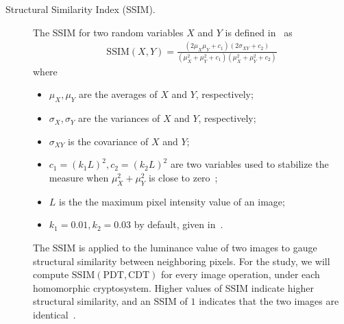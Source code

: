 \begin{description}
	\item [Structural Similarity Index (SSIM).]
	The SSIM for two random variables $X$ and $Y$ is defined in~\cite{ahmed_benchmark_2016, akramullah_video_2014} as
	\begin{align}
        \mathrm{SSIM}(X,Y) = \frac{(2\mu_X\mu_Y+c_1)(2\sigma_{XY}+c_2)}{(\mu_X^2+\mu_Y^2+c_1)(\mu_X^2+\mu_Y^2+c_2)}
	\end{align}
	where
	\begin{itemize}
		\item $\mu_X, \mu_Y$ are the averages of $X$ and $Y$, respectively;
		\item $\sigma_X, \sigma_Y$ are the variances of $X$ and $Y$, respectively;
		\item $\sigma_{XY}$ is the covariance of $X$ and $Y$;
		\item $c_1 = (k_1L)^2, c_2 = (k_2L)^2$ are two variables used to stabilize the measure when $\mu_X^2+\mu_Y^2$ is close to zero~\cite{akramullah_video_2014};
		\item $L$ is the the maximum pixel intensity value of an image;
		\item $k_1 = 0.01, k_2 = 0.03$ by default, given in~\cite{ahmed_benchmark_2016}.
	\end{itemize}
	The SSIM is applied to the luminance value of two images to gauge structural similarity between neighboring pixels.
    For the study, we will compute $\mathrm{SSIM}(\mathrm{PDT}, \mathrm{CDT})$ for every image operation, under each homomorphic cryptosystem. Higher values of SSIM indicate higher structural similarity, and an SSIM of $1$ indicates that the two images are identical~\cite{ahmed_benchmark_2016}.
\end{description}

